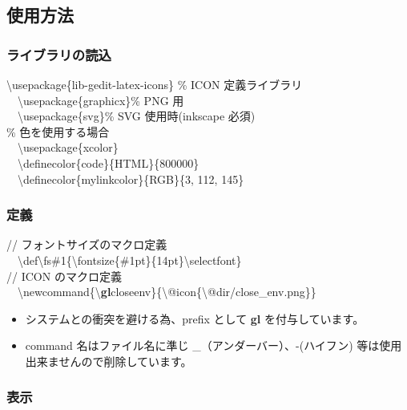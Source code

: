 \documentclass[a5j,10pt]{ltjarticle}
\begin{document}
\subsection{使用方法}

\subsubsection{ライブラリの読込}
{\textbackslash}usepackage\{lib-gedit-latex-icons\} \% ICON 定義ライブラリ \\ 
　{\textbackslash}usepackage\{graphicx\}\hspace{18mm}\% PNG 用\\ 
　{\textbackslash}usepackage\{svg\}\hspace{26mm}\% SVG 使用時(inkscape 必須)\\ 

\% 色を使用する場合\\
　{\textbackslash}usepackage\{xcolor\}\\
　{\textbackslash}definecolor\{code\}\{HTML\}\{800000\}\\
　{\textbackslash}definecolor\{mylinkcolor\}\{RGB\}\{3, 112, 145\}

\subsubsection{定義}
// フォントサイズのマクロ定義　\\
　{\textbackslash}def{\textbackslash}fs\#1\{{\textbackslash}fontsize\{\#1pt\}\{14pt\}{\textbackslash}selectfont\}\\

// ICON のマクロ定義\\
　{\textbackslash}newcommand\{{\textbackslash}\textbf{gl}closeenv\}\{{\textbackslash}@icon\{{\textbackslash}@dir/close\_env.png\}\}\\
\begin{itemize}\vspace{-6mm}
  \item システムとの衝突を避ける為、prefix として \textbf{gl} を付与しています。
\vspace{-3mm}
　\item command 名はファイル名に準じ \_（アンダーバー）、-(ハイフン) 等は使用出来ませんので削除しています。
\end{itemize}


\subsubsection{表示}
\end{document}
